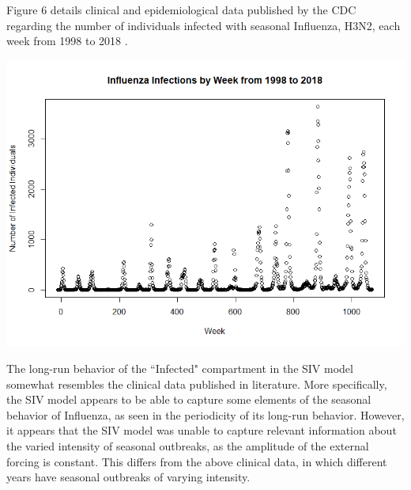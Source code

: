 \documentclass[12pt]{article}
\newenvironment{Figure}
  {\par\medskip\noindent\minipage{\linewidth}}
  {\endminipage\par\medskip}
\begin{document}
Figure 6 details clinical and epidemiological data published by the CDC regarding the number of individuals infected with seasonal Influenza, H3N2, each week from 1998 to 2018 \citep{centers2018weekly}.

\begin{Figure}
    \centering
    \includegraphics[width = \linewidth]{cdc_influenzaData.png}
\end{Figure}

The long-run behavior of the ``Infected" compartment in the SIV model somewhat resembles the clinical data published in literature. More specifically, the SIV model appears to be able to capture some elements of the seasonal behavior of Influenza, as seen in the periodicity of its long-run behavior. However, it appears that the SIV model was unable to capture relevant information about the varied intensity of seasonal outbreaks, as the amplitude of the external forcing is constant. This differs from the above clinical data, in which different years have seasonal outbreaks of varying intensity.
\end{document}
